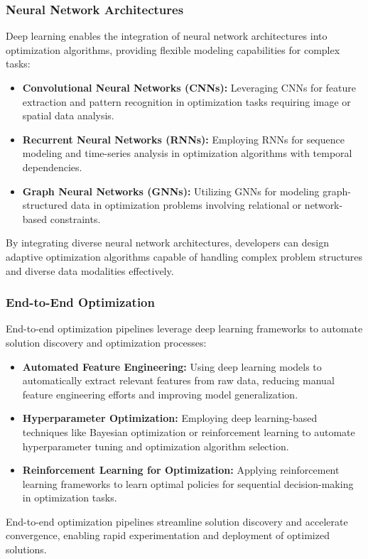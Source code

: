 \documentclass[11pt]{report}
\begin{document}
        \subsubsection{Neural Network Architectures}
        Deep learning enables the integration of neural network architectures into optimization algorithms, providing flexible modeling capabilities for complex tasks:
        \begin{itemize}
            \item \textbf{Convolutional Neural Networks (CNNs):} Leveraging CNNs for feature extraction and pattern recognition in optimization tasks requiring image or spatial data analysis.
        
            \item \textbf{Recurrent Neural Networks (RNNs):} Employing RNNs for sequence modeling and time-series analysis in optimization algorithms with temporal dependencies.
        
            \item \textbf{Graph Neural Networks (GNNs):} Utilizing GNNs for modeling graph-structured data in optimization problems involving relational or network-based constraints.
        \end{itemize}
        
        By integrating diverse neural network architectures, developers can design adaptive optimization algorithms capable of handling complex problem structures and diverse data modalities effectively.
        
        \subsubsection{End-to-End Optimization}
        End-to-end optimization pipelines leverage deep learning frameworks to automate solution discovery and optimization processes:
        \begin{itemize}
            \item \textbf{Automated Feature Engineering:} Using deep learning models to automatically extract relevant features from raw data, reducing manual feature engineering efforts and improving model generalization.
        
            \item \textbf{Hyperparameter Optimization:} Employing deep learning-based techniques like Bayesian optimization or reinforcement learning to automate hyperparameter tuning and optimization algorithm selection.
        
            \item \textbf{Reinforcement Learning for Optimization:} Applying reinforcement learning frameworks to learn optimal policies for sequential decision-making in optimization tasks.
        \end{itemize}
        End-to-end optimization pipelines streamline solution discovery and accelerate convergence, enabling rapid experimentation and deployment of optimized solutions.
\end{document}
